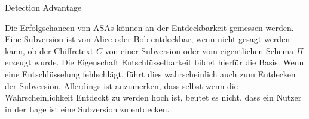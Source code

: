 \begin{section}{Detection Advantage}

Die Erfolgschancen von ASAs können an der Entdeckbarkeit gemessen werden. Eine Subversion ist von Alice oder Bob entdeckbar, wenn nicht gesagt werden kann, ob der Chiffretext $C$ von einer Subversion oder vom eigentlichen Schema $\Pi$ erzeugt wurde. Die Eigenschaft Entschlüsselbarkeit bildet hierfür die Basis. Wenn eine Entschlüsselung fehlschlägt, führt dies wahrscheinlich auch zum Entdecken der Subversion. Allerdings ist anzumerken, dass selbst wenn die Wahrscheinlichkeit Entdeckt zu werden hoch ist, beutet es nicht, dass ein Nutzer in der Lage ist eine Subversion zu entdecken.

\end{section}
